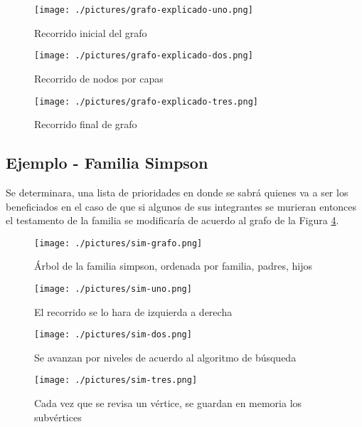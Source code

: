 \documentclass[letterpaper,12pt]{article}
\begin{document}
		\begin{figure}[!h]
  		\centering
  	  	\texttt{[image: ./pictures/grafo-explicado-uno.png]}
	  	\caption{Recorrido inicial del grafo}
  		\label{fig:grafo-uno}
		\end{figure}
		
		\begin{figure}[!h]
  		\centering
  	  	\texttt{[image: ./pictures/grafo-explicado-dos.png]}
	  	\caption{Recorrido de nodos por capas}
  		\label{fig:grafo-dos}
		\end{figure}
		
		\begin{figure}[!h]
  		\centering
  	  	\texttt{[image: ./pictures/grafo-explicado-tres.png]}
	  	\caption{Recorrido final de grafo}
  		\label{fig:grafo-tres}
		\end{figure}
		
		\subsection{Ejemplo - Familia Simpson}
		
		Se determinara, una lista de prioridades en donde se sabr\'a quienes va a ser los beneficiados en el caso de que si algunos de sus integrantes se murieran entonces el testamento de la familia se modificar\'ia de acuerdo al grafo de la Figura \ref{fig:grafo-sim-uno}.
		
  	\begin{figure}[!h]
  		\centering
  	  	\texttt{[image: ./pictures/sim-grafo.png]}
	  	\caption{\'Arbol de la familia simpson, ordenada por familia, padres, hijos}
  		\label{fig:grafo-sim-uno}
		\end{figure}
		
		\begin{figure}[!h]
  		\centering
  	  	\texttt{[image: ./pictures/sim-uno.png]}
	  	\caption{El recorrido se lo hara de izquierda a derecha}
  		\label{fig:grafo-sim-dos}
		\end{figure}
		
		\begin{figure}[!h]
  		\centering
  	  	\texttt{[image: ./pictures/sim-dos.png]}
	  	\caption{Se avanzan por niveles de acuerdo al algoritmo de b\'usqueda}
  		\label{fig:grafo-sim-tres}
		\end{figure}

		\begin{figure}[!h]
  		\centering
  	  	\texttt{[image: ./pictures/sim-tres.png]}
	  	\caption{Cada vez que se revisa un v\'ertice, se guardan en memoria los subv\'ertices}
  		\label{fig:grafo-sim-cuatro}
		\end{figure}
		
\end{document}
